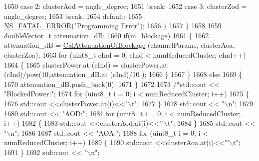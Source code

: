 \begin{DoxyCode}
1650                 \textcolor{keywordflow}{case} 2: clusterAod = angle\_degree;
1651                                 \textcolor{keywordflow}{break};
1652                 \textcolor{keywordflow}{case} 3: clusterZod = angle\_degree;
1653                                 \textcolor{keywordflow}{break};
1654                 \textcolor{keywordflow}{default}:
1655                         \hyperlink{group__fatal_ga5131d5e3f75d7d4cbfd706ac456fdc85}{NS\_FATAL\_ERROR}(\textcolor{stringliteral}{"Programming Error"});
1656                 \}
1657         \}
1658 
1659         \hyperlink{namespacens3_aa6f1edf6566ca6afec613bc6e40240ea}{doubleVector\_t} attenuation\_dB;
1660         \textcolor{keywordflow}{if}(\hyperlink{classns3_1_1MmWave3gppChannel_a5f19d0ed379e7db9448f4f668e0c7927}{m\_blockage})
1661         \{
1662                  attenuation\_dB = \hyperlink{classns3_1_1MmWave3gppChannel_aff8853ed48d4aeb1a5d4960a843f5f1a}{CalAttenuationOfBlockage} (channelParams, 
      clusterAoa, clusterZoa);
1663                  \textcolor{keywordflow}{for} (uint8\_t cInd = 0; cInd < numReducedCluster; cInd++)
1664                  \{
1665                          clusterPower.at (cInd) = clusterPower.at (cInd)/pow(10,attenuation\_dB.at (cInd)/10
      );
1666                  \}
1667         \}
1668         \textcolor{keywordflow}{else}
1669         \{
1670                 attenuation\_dB.push\_back(0);
1671         \}
1672 
1673         \textcolor{comment}{/*std::cout << "BlockedPower:";}
1674 \textcolor{comment}{        for (uint8\_t i = 0; i < numReducedCluster; i++)}
1675 \textcolor{comment}{        \{}
1676 \textcolor{comment}{                std::cout <<clusterPower.at(i)<<"\(\backslash\)t";}
1677 \textcolor{comment}{        \}}
1678 \textcolor{comment}{        std::cout << "\(\backslash\)n";}
1679 \textcolor{comment}{}
1680 \textcolor{comment}{        std::cout << "AOD:";}
1681 \textcolor{comment}{        for (uint8\_t i = 0; i < numReducedCluster; i++)}
1682 \textcolor{comment}{        \{}
1683 \textcolor{comment}{                std::cout <<clusterAod.at(i)<<"'\(\backslash\)t";}
1684 \textcolor{comment}{        \}}
1685 \textcolor{comment}{        std::cout << "\(\backslash\)n";}
1686 \textcolor{comment}{}
1687 \textcolor{comment}{        std::cout << "AOA:";}
1688 \textcolor{comment}{        for (uint8\_t i = 0; i < numReducedCluster; i++)}
1689 \textcolor{comment}{        \{}
1690 \textcolor{comment}{                std::cout <<clusterAoa.at(i)<<"'\(\backslash\)t";}
1691 \textcolor{comment}{        \}}
1692 \textcolor{comment}{        std::cout << "\(\backslash\)n";}

\end{DoxyCode}
